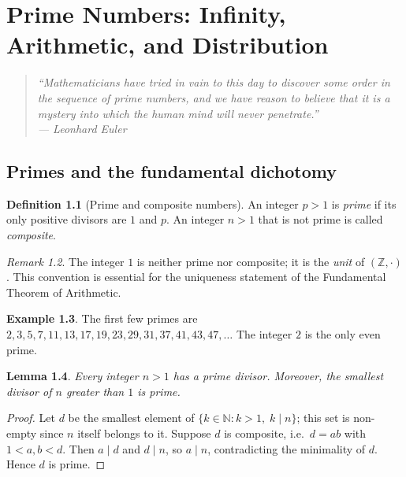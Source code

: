 \documentclass[12pt,a4paper,openany]{book}
\theoremstyle{definition}
\newtheorem{definition}{Definition}[chapter]
\newtheorem{example}[definition]{Example}
\theoremstyle{plain}
\newtheorem{lemma}[definition]{Lemma}
\theoremstyle{remark}
\newtheorem{remark}[definition]{Remark}
\newcommand{\N}{\mathbb{N}}
\newcommand{\Z}{\mathbb{Z}}
\begin{document}
\chapter{Prime Numbers: Infinity, Arithmetic, and Distribution}
\label{ch:primes}

\begin{quote}
\itshape
``Mathematicians have tried in vain to this day to discover some order in the
sequence of prime numbers, and we have reason to believe that it is a mystery
into which the human mind will never penetrate.''\\
--- Leonhard Euler
\end{quote}

\section{Primes and the fundamental dichotomy}
\label{sec:primes-def}

\begin{definition}[Prime and composite numbers]
\label{def:prime}
An integer $p > 1$ is \emph{prime} if its only positive divisors
are $1$ and $p$. An integer $n > 1$ that is not prime is called
\emph{composite}.
\end{definition}

\begin{remark}
\label{rem:unit}
The integer $1$ is neither prime nor composite; it is the \emph{unit} of
$(\Z, \cdot)$. This convention is essential for the uniqueness statement of
the Fundamental Theorem of Arithmetic.
\end{remark}

\begin{example}
\label{ex:small-primes}
The first few primes are $2, 3, 5, 7, 11, 13, 17, 19, 23, 29, 31, 37, 41,
43, 47, \ldots$ The integer $2$ is the only even prime.
\end{example}

\begin{lemma}
\label{lem:smallest-divisor-prime}
Every integer $n > 1$ has a prime divisor. Moreover, the smallest divisor of
$n$ greater than $1$ is prime.
\end{lemma}

\begin{proof}
Let $d$ be the smallest element of $\{k \in \N : k > 1,\; k \mid n\}$; this
set is non-empty since $n$ itself belongs to it. Suppose $d$ is composite,
i.e.\ $d = ab$ with $1 < a, b < d$. Then $a \mid d$ and $d \mid n$, so
$a \mid n$, contradicting the minimality of $d$. Hence $d$ is prime.
\end{proof}
\end{document}
